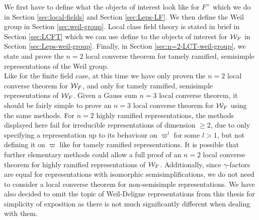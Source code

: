 We first have to define what the objects of interest look like for $F^\times$ which we do in Section \ref{sec:local-fields} and Section \ref{sec:Leps-LF}.
We then define the Weil group in Section \ref{sec:weil-group}.
Local class field theory is stated in brief in Section \ref{sec:LCFT} which we can use define to the objects of interest for $\mathcal{W}_F$ in Section \ref{sec:Leps-weil-group}.
Finally, in Section \ref{sec:n=2-LCT-weil-group}, we state and prove the $n=2$ local converse theorem for tamely ramified, semisimple representations of the Weil group.
\\

Like for the finite field case, at this time we have only proven the $n=2$ local converse theorem for $\mathcal{W}_F$, and only for tamely ramified, semisimple representations of $\mathcal{W}_F$.
Given a Gauss sum $n=3$ local converse theorem, it should be fairly simple to prove an $n=3$ local converse theorem for $\mathcal{W}_F$ using the same methods.
For $n=2$ highly ramified representations, the methods displayed here fail for irreducible representations of dimension $\geq 2$, due to only specifying a representation up to its behaviour on $\varpi^l$ for some $l > 1$, but not defining it on $\varpi$ like for tamely ramified representations.
It is possible that further elementary methods could allow a full proof of an $n=2$ local converse theorem for highly ramified representations of $\mathcal{W}_F$.
Additionally, since $\gamma$-factors are equal for representations with isomorphic semisimplifications, we do not need to consider a local converse theorem for non-semisimple representations.
We have also decided to omit the topic of Weil-Deligne representations from this thesis for simplicity of exposition as there is not much significantly different when dealing with them.
\\
\endinput

